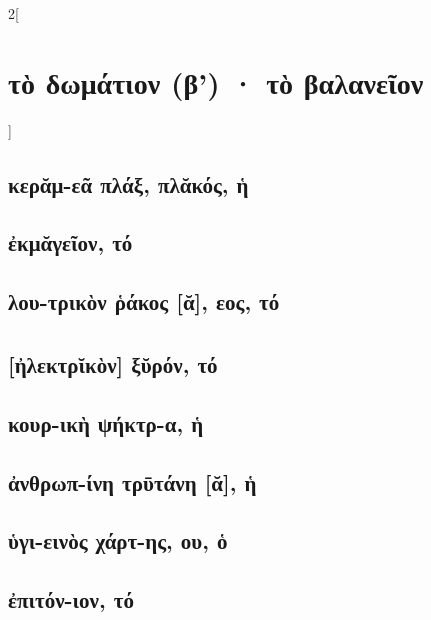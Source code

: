 \documentclass{book}
\begin{document}
\begin{multicols}{2}[\section{τὸ δωμάτιον (β') · τὸ βαλανεῖον}]
\subsection{κερᾰμ-εᾶ πλάξ, πλᾰκός, ἡ}
\subsection{ἐκμᾰγεῖον, τό}
\subsection{λου-τρικὸν ῥάκος [ᾰ], εος, τό}
\subsection{[ἠλεκτρῐκὸν\textsuperscript{\textdagger}] ξῠρόν, τό}
\subsection{κουρ-ικὴ ψήκτρ-α, ἡ}
\subsection{ἀνθρωπ-ίνη τρῡτάνη [ᾰ], ἡ}
\subsection{ὑγι-εινὸς χάρτ-ης, ου, ὁ}
\subsection{ἐπιτόν-ιον, τό}
~
\end{multicols}
\newpage  
\end{document}

